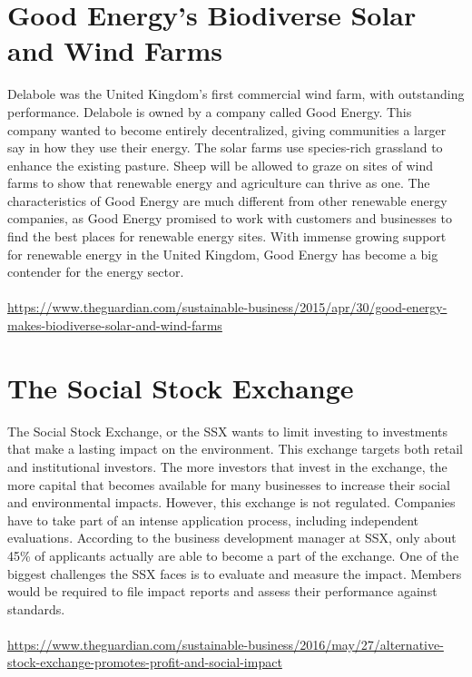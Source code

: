 \documentclass{article}
\begin{document}
\begin{spacing}{2.15}
    \section{Good Energy's Biodiverse Solar and Wind Farms}
    \indent Delabole was the United Kingdom's first commercial wind farm, with outstanding performance. Delabole is owned by a company called Good Energy. This company wanted to become entirely decentralized, giving communities a larger say in how they use their energy. The solar farms use species-rich grassland to enhance the existing pasture. Sheep will be allowed to graze on sites of wind farms to show that renewable energy and agriculture can thrive as one. The characteristics of Good Energy are much different from other renewable energy companies, as Good Energy promised to work with customers and businesses to find the best places for renewable energy sites. With immense growing support for renewable energy in the United Kingdom, Good Energy has become a big contender for the energy sector.\\\\
    \url{https://www.theguardian.com/sustainable-business/2015/apr/30/good-energy-makes-biodiverse-solar-and-wind-farms}
    \section{The Social Stock Exchange}
    \indent The Social Stock Exchange, or the SSX wants to limit investing to investments that make a lasting impact on the environment. This exchange targets both retail and institutional investors. The more investors that invest in the exchange, the more capital that becomes available for many businesses to increase their social and environmental impacts. However, this exchange is not regulated. Companies have to take part of an intense application process, including independent evaluations. According to the business development manager at SSX, only about 45\% of applicants actually are able to become a part of the exchange. One of the biggest challenges the SSX faces is to evaluate and measure the impact. Members would be required to file impact reports and assess their performance against standards.\\\\
    \url{https://www.theguardian.com/sustainable-business/2016/may/27/alternative-stock-exchange-promotes-profit-and-social-impact}
    \newpage

\end{spacing}
\end{document}
